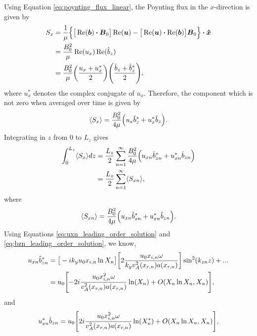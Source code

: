 Using Equation \eqref{eq:poynting_flux_linear}, the Poynting flux in the $x$-direction is given by
\begin{equation}
\begin{aligned}
    S_x &= \frac{1}{\mu}\Big\{\big[\Re(\vec{b})\vdot\vec{B}_0\big]\Re(\vec{u}) - \big[\Re(\vec{u})\vdot\Re(\vec{b})\big]\vec{B}_0\Big\}\vdot\vec{\hat{x}} \\
    &= \frac{B_0^2}{\mu}\Re(u_x)\Re(\hat{b}_z) \\
    &= \frac{B_0^2}{\mu}\qty(\frac{u_x + u_x^*}{2})\qty(\frac{\hat{b}_z+\hat{b}_z^*}{2}),
\end{aligned}
\end{equation}
where $u_x^*$ denotes the complex conjugate of $u_x$. Therefore, the component which is not zero when averaged over time is given by
\begin{equation}
    \label{eq:chap_4_avg_poy_flux}
    \langle S_x \rangle = \frac{B_0^2}{4\mu}\qty(u_x\hat{b}_z^* + u_x^*\hat{b}_z).
\end{equation}
Integrating in $z$ from $0$ to $L_z$ gives
\begin{equation}
    \begin{aligned}
    \int_0^{L_z}\langle S_x \rangle dz &= \frac{L_z}{2}\sum_{n=1}^\infty\frac{B_0^2}{4\mu}\qty(u_{xn}\hat{b}_{zn}^* + u_{xn}^*\hat{b}_{zn}) \\
    &= \frac{L_z}{2}\sum_{n=1}^\infty \langle S_{xn} \rangle,
    \end{aligned}
\end{equation}
where 
\begin{equation}
    \label{eq:chap_4_avg_poy_flux_nth_contribution}
    \langle S_{xn} \rangle = \frac{B_0^2}{4\mu}\qty(u_{xn}\hat{b}_{zn}^* + u_{xn}^*\hat{b}_{zn}).
\end{equation}
Using Equations \eqref{eq:uxn_leading_order_solution} and \eqref{eq:bzn_leading_order_solution}, we know,
\begin{equation}
    \begin{aligned}
    u_{xn}\hat{b}_{zn}^* &= \big[-ik_y u_0x_{i,n}\ln X_n\big]\qty[2\frac{u_0x_{i,n}\omega}{k_yv_{A}^2(x_{r,n})a(x_{r,n})}]\sin^2(k_{zn}z) + ... \\
    &= u_0\qty[-2i\frac{u_0x_{i,n}^2\omega}{v_{A}^2(x_{r,n})a(x_{r,n})}\ln(X_n) + O\qty(X_n\ln X_n, X_n)],
    \end{aligned}
\end{equation}
and
\begin{equation}
    u_{xn}^*\hat{b}_{zn} = u_0\qty[2i\frac{u_0x_{i,n}^2\omega}{v_{A}^2(x_{r,n})a(x_{r,n})}\ln(X_n^*) + O\qty(X_n\ln X_n, X_n)],
\end{equation}
